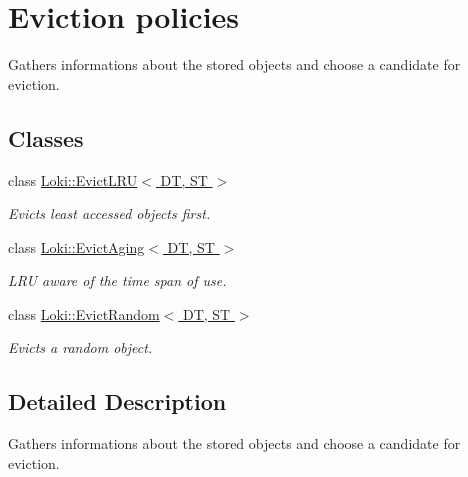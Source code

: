 \hypertarget{group__EvictionPolicyCachedFactoryGroup}{}\section{Eviction policies}
\label{group__EvictionPolicyCachedFactoryGroup}


Gathers informations about the stored objects and choose a candidate for eviction.  


\subsection*{Classes}
\begin{DoxyCompactItemize}
\item 
class \hyperlink{classLoki_1_1EvictLRU}{Loki\+::\+Evict\+L\+R\+U$<$ D\+T, S\+T $>$}
\begin{DoxyCompactList}\small\item\em Evicts least accessed objects first. \end{DoxyCompactList}\item 
class \hyperlink{classLoki_1_1EvictAging}{Loki\+::\+Evict\+Aging$<$ D\+T, S\+T $>$}
\begin{DoxyCompactList}\small\item\em L\+R\+U aware of the time span of use. \end{DoxyCompactList}\item 
class \hyperlink{classLoki_1_1EvictRandom}{Loki\+::\+Evict\+Random$<$ D\+T, S\+T $>$}
\begin{DoxyCompactList}\small\item\em Evicts a random object. \end{DoxyCompactList}\end{DoxyCompactItemize}


\subsection{Detailed Description}
Gathers informations about the stored objects and choose a candidate for eviction. 


